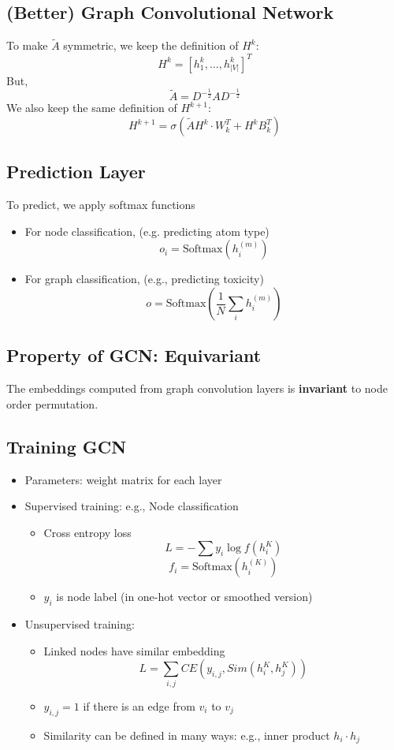 \documentclass[10pt]{article}
\begin{document}
\subsection*{(Better) Graph Convolutional Network}
To make $\tilde{A}$ symmetric, we keep the definition of $H^k$:
\[H^k = [h_1^k, \dots, h_{|V|}^k]^T\]
But, 
\[\tilde{A} = D^{-\frac{1}{2}} A D^{-\frac{1}{2}}\]
We also keep the same definition of $H^{k + 1}$:
\[H^{k + 1} = \sigma(\tilde{A} H^k \cdot W_k^T + H^k B_k^T)\]

\subsection*{Prediction Layer}
To predict, we apply softmax functions
\begin{itemize}
	\item For node classification, (e.g. predicting atom type)
	\[o_i = \text{Softmax}(h_i^{(m)})\]
    \item For graph classification, (e.g., predicting toxicity)
    \[o = \text{Softmax}(\frac{1}{N} \sum_i h_i^{(m)})\]
\end{itemize}

\subsection*{Property of GCN: Equivariant}
The embeddings computed from graph convolution layers is \textbf{invariant} to node order permutation.

\subsection*{Training GCN}
\begin{itemize}
	\item Parameters: weight matrix for each layer
	\item Supervised training: e.g., Node classification
	\begin{itemize}
	    \item Cross entropy loss
	    \[L = -\sum y_i \log f(h_i^K)\]
        \[f_i = \text{Softmax}(h_i^{(K)})\]
        \item $y_i$ is node label (in one-hot vector or smoothed version)
    \end{itemize}
    \item Unsupervised training:
    \begin{itemize}
	    \item Linked nodes have similar embedding
	    \[L = \sum_{i, j} CE(y_{i, j}, Sim(h_i^K, h_j^K))\]
        \item $y_{i, j} = 1$ if there is an edge from $v_i$ to $v_j$
        \item Similarity can be defined in many ways: e.g., inner product $h_i \cdot h_j$
    \end{itemize}
\end{itemize}
\end{document}
